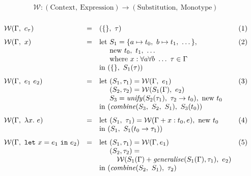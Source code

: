 \documentclass[a4paper,fleqn,oneside,12pt]{report}
\begin{document}
$$
\mathcal{W}: (\mathrm{Context},\ \mathrm{Expression}) \rightarrow (\mathrm{Substitution},\ \mathrm{Monotype})
$$$$
\begin{array}{lclc}
  \\
    \mathcal{W}(\Gamma,\ c_{\tau})                                & = & (\{\},\ \tau) & (1)\vspace{0.25cm}\\
    \mathcal{W}(\Gamma,\ x)                                       & = & \textrm{let}\ S_1 = \{ a \mapsto t_0,\ b \mapsto t_1,\ \dots \},& (2)\\
                                                                  &   & \phantom{\textrm{let}}\ \textrm{new}\ t_0,\ t_1,\ \dots &\\
                                                                  &   & \phantom{\textrm{let}}\ \textrm{where}\ x : \forall a \forall b\ \dots\ \tau \in \Gamma &\\
                                                                  &   & \textrm{in}\ (\{\},\ S_1(\tau)) &\vspace{0.25cm}\\
    \mathcal{W}(\Gamma,\ e_1\ e_2)                                & = & \textrm{let}\ (S_1, \tau_1) = \mathcal{W}(\Gamma,\ e_1) & (3)\\
                                                                  &   & \phantom{\textrm{let}}\ (S_2, \tau_2) = \mathcal{W}(S_1(\Gamma),\ e_2) &\\
                                                                  &   & \phantom{\textrm{let}}\ S_3 = \mathit{unify}(S_2(\tau_1),\ \tau_2 \rightarrow t_0),\ \textrm{new}\ t_0 &\\
                                                                  &   & \textrm{in}\ (\mathit{combine}(S_3,\ S_2,\ S_1),\ S_3(t_0)) &\vspace{0.25cm}\\
    \mathcal{W}(\Gamma,\ \lambda x.\ e  )                         & = & \textrm{let}\ (S_1,\ \tau_1) = \mathcal{W}(\Gamma + x : t_0, e),\ \textrm{new}\ t_0 & (4)\\
                                                                  &   & \textrm{in}\ (S_1,\ S_1(t_0 \rightarrow \tau_1)) &\vspace{0.25cm}\\
    \mathcal{W}(\Gamma,\ \mathtt{let}\ x = e_1\ \mathtt{in}\ e_2) & = & \textrm{let}\ (S_1, \tau_1) = \mathcal{W}(\Gamma, e_1) & (5)\\
                                                                  &   & \phantom{\textrm{let}}\ (S_2, \tau_2) = &\\
                                                                  &   & \phantom{\textrm{let}}\ \quad \mathcal{W}(S_1(\Gamma) + \mathit{generalise}(S_1(\Gamma), \tau_1),\ e_2) &\\
                                                                  &   & \textrm{in}\ (\mathit{combine}(S_2,\ S_1),\ \tau_2) &\\
  \\
\end{array}
$$
\end{document}
